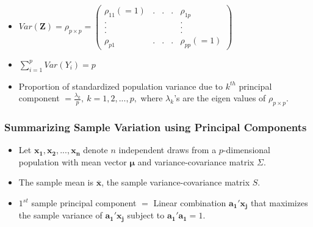 \documentclass[10pt]{beamer} %
\begin{document}
\begin{frame}
   \begin{itemize}
      \item $Var(\boldsymbol{Z}) = \rho_{p \times p}=\begin{pmatrix}
            \rho_{11}(=1) & . & . & . & \rho_{1p} \\ . & & & & . \\ . & & & & .
            \\ . & & & & . \\ \rho_{p1} & . & . & . & \rho_{pp}(=1)
         \end{pmatrix}$
      \item $\sum_{i=1}^p Var(Y_i) = p$
         \vspace{0.5cm}
      \item Proportion of standardized population variance due to $k^{th}$
         principal component $=\frac{\lambda_k}{p},\ k=1,2,...,p,$ where
         $\lambda_k$'s are the eigen values of $\rho_{p \times p}$.
   \end{itemize}
\end{frame}

\begin{frame}
   \frametitle{Summarizing Sample Variation using Principal Components}
   \begin{itemize}
      \item Let $\boldsymbol{x_1},\boldsymbol{x_2},...,\boldsymbol{x_n}$ denote
         $n$ independent draws from a $p$-dimensional population with mean
         vector $\boldsymbol{\mu}$ and variance-covariance matrix $\Sigma$.
         \vspace{0.5cm}
      \item The sample mean is $\overline{\boldsymbol{x}}$, the sample
         variance-covariance matrix $S$.
         \vspace{0.5cm}
      \item $1^{st}$ sample principal component $=$ Linear combination
         $\boldsymbol{a_{1}'}\boldsymbol{x_j}$ that maximizes the sample
         variance of $\boldsymbol{a_{1}'}\boldsymbol{x_j}$ subject to
         $\boldsymbol{a_{1}'}\boldsymbol{a_1} = 1.$ 
   \end{itemize}
\end{frame}
\end{document}
